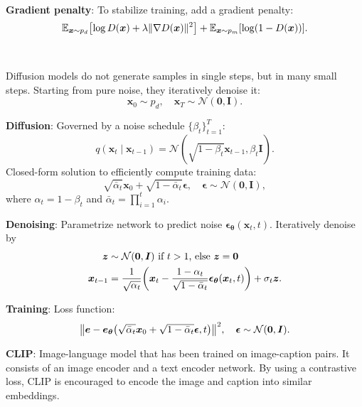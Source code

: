 \documentclass{article}
\newcommand{\lft}{\mathopen{}\mathclose\bgroup\left}
\newcommand{\rgt}{\aftergroup\egroup\right}
\newcommand{\E}{\mathbb{E}}
\renewcommand{\vec}[1]{\bm{#1}}
\newcommand{\mat}[1]{\bm{#1}}
\newenvironment{topic}[1]
{\textbf{\sffamily \colorbox{black}{\rlap{\textbf{\textcolor{white}{#1}}}\hspace{\linewidth}\hspace{-2\fboxsep}}} \\ \vspace{0.2cm}}
{}
\begin{document}
\begin{multicols*}{2}
\begin{topic}{Generative adversarial network}
        \textbf{Gradient penalty}: To stabilize training, add a gradient penalty: \[
            \E_{\vec{x} \sim p_d} \lft[ \log D(\vec{x}) + \lambda \| \nabla D(\vec{x}) \|^2 \rgt] + \E_{\vec{x} \sim p_m} [\log (1 - D(\vec{x}))].
        \]

    \end{topic}

    \begin{topic}{Diffusion models}

        Diffusion models do not generate samples in single steps, but in many small steps. Starting from
        pure noise, they iteratively denoise it: \[
            \vec{x}_0 \sim p_d, \quad \vec{x}_T \sim \mathcal{N}(\vec{0}, \mat{I}).
        \]

        \textbf{Diffusion}: Governed by a noise schedule $\{ \beta_t \}_{t=1}^T$: \[
            q(\vec{x}_t \mid \vec{x}_{t-1}) = \mathcal{N}(\sqrt{1 - \beta_t} \vec{x}_{t-1}, \beta_t \mat{I}).
        \]
        Closed-form solution to efficiently compute training data: \[
            \sqrt{\bar{\alpha}_t} \vec{x}_0 + \sqrt{1 - \bar{\alpha}_t} \vec{\epsilon}, \quad \vec{\epsilon} \sim \mathcal{N}(\vec{0}, \mat{I}),
        \]
        where $\alpha_t = 1 - \beta_t$ and $\bar{\alpha}_t = \prod_{i=1}^t \alpha_i$.

        \textbf{Denoising}: Parametrize network to predict noise
        $\vec{\epsilon}_{\vec{\theta}}(\vec{x}_t, t)$. Iteratively denoise by
        \begin{align*}
            \vec{z}       & \sim \mathcal{N}(\vec{0}, \mat{I}) \text{ if $t > 1$, else $\vec{z} = \vec{0}$}                                                                                    \\
            \vec{x}_{t-1} & = \frac{1}{\sqrt{\alpha_t}} \lft( \vec{x}_t - \frac{1 - \alpha_t}{\sqrt{1 - \bar{\alpha}_t}} \vec{\epsilon}_{\vec{\theta}}(\vec{x}_t, t) \rgt) + \sigma_t \vec{z}.
        \end{align*}

        \textbf{Training}: Loss function: \[
            \lft\| \vec{e} - \vec{e}_{\vec{\theta}}\lft( \sqrt{\bar{\alpha}_t} \vec{x}_0 + \sqrt{1 - \bar{\alpha}_t} \vec{\epsilon}, t \rgt) \rgt\|^2, \quad \vec{\epsilon} \sim \mathcal{N}(\vec{0}, \mat{I}).
        \]

        \textbf{CLIP}: Image-language model that has been trained on image-caption pairs. It consists
        of an image encoder and a text encoder network. By using a contrastive loss, CLIP is
        encouraged to encode the image and caption into similar embeddings.


\end{topic}
\end{multicols*}
\end{document}
